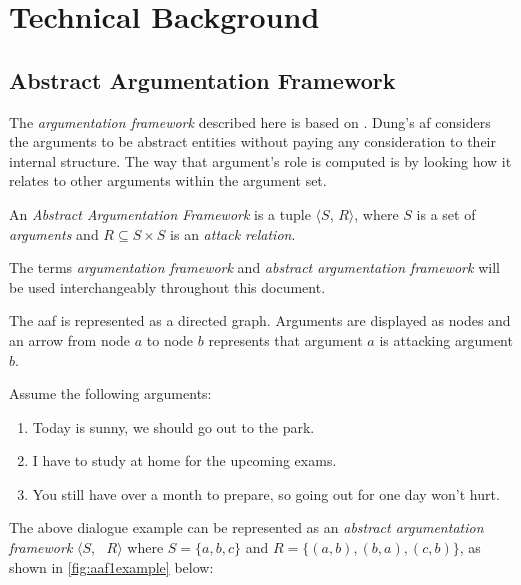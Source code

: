 \section{Technical Background} 
    \subsection{Abstract Argumentation Framework}
        The \textit{argumentation framework} described here is based on \autocite{Dung1995OnTA}. Dung's \gls{af} considers the arguments to be abstract entities without paying any consideration to their internal structure. The way that argument's role is computed is by looking how it relates to other arguments within the argument set.
        
        \begin{definition}
            An \textit{Abstract Argumentation Framework} is a tuple $\langle S$, $R \rangle$, where $S$ is a set of \textit{arguments} and $R \subseteq S \times S$ is an \textit{attack relation}.
            \label{definition:definition1}
        \end{definition}
        
        \begin{remark}
            The terms \textit{argumentation framework} and \textit{abstract argumentation framework} will be used interchangeably throughout this document.
            \label{remark:remark1}
        \end{remark}
        
        The \gls{aaf} is represented as a directed graph. Arguments are displayed as nodes and an arrow from node $a$ to node $b$ represents that argument $a$ is attacking argument $b$.
        \begin{exa}
            Assume the following arguments:
            \begin{enumerate}[label=\alph* -]
                \item Today is sunny, we should go out to the park.
                \item I have to study at home for the upcoming exams.
                \item You still have over a month to prepare, so going out for one day won't hurt.
            \end{enumerate}
            \label{exa:example1}
        \end{exa}
        
        The above dialogue example can be represented as an \textit{abstract argumentation framework} $\langle S, \text{ }R \rangle$ where $S = \{a, b, c\}$ and $R = \{(a, b), (b, a), (c, b)\}$, as shown in \autoref{fig:aaf1example} below:
        
        
